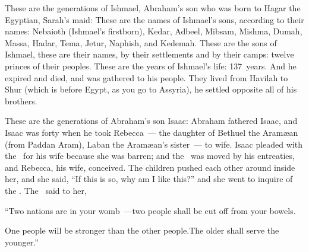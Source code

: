 \begin{inparaenum}
   These are the generations of Ishmael, Abraham's son who was born to Hagar the Egyptian, Sarah's maid:%
   These are the names of Ishmael's sons, according to their names: Nebaioth (Ishmael's firstborn), Kedar, Adbeel, Mibsam,%
   Mishma, Dumah, Massa,%
   Hadar, Tema, Jetur, Naphish, and Kedemah.%
   These are the sons of Ishmael, these are their names, by their settlements and by their camps: twelve princes of their peoples.%
   These are the years of Ishmael's life: 137~years. And he expired and died, and was gathered to his people.%
   They lived from Havilah to Shur (which is before Egypt, as you go to Assyria), he settled opposite all of his brothers.%
  
   These are the generations of Abraham's son Isaac: Abraham fathered Isaac,%
   and Isaac was forty when he took Rebecca~--- the daughter of Bethuel the Aram\ae an (from Paddan Aram), Laban the Aram\ae an's sister~--- to wife.%
   Isaac pleaded with the \lord\ for his wife because she was barren; and the \lord\ was moved by his entreaties, and Rebecca, his wife, conceived.%
   The children pushed each other around inside her, and she said, ``If this is so, why am I like this?'' and she went to inquire of the \lord.%
   The \lord\ said to her,\smallskip%
  
  \pd ``Two nations are in your womb~---\pa two people shall be cut off from your bowels.%
  
  \pd One people will be stronger than the other people.\pa The older shall serve the younger.''%
  

\end{inparaenum}

